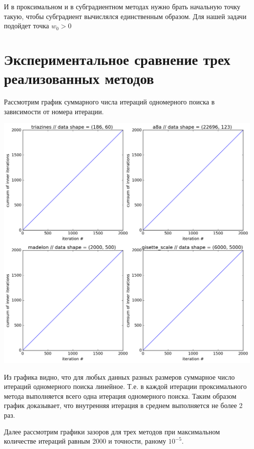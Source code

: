 \documentclass[12pt, a4paper]{article}
\begin{document}
    И в проксимальном и в субградиентном методах нужно брать начальную точку такую, чтобы субградиент вычислялся единственным образом. Для нашей задачи подойдет точка $w_0 > 0$


    \section{Экспериментальное сравнение трех реализованных методов}

    Рассмотрим график суммарного числа итераций одномерного поиска в зависимости от номера итерации.

    \def \picwidth {16cm}
    \begin{center}\includegraphics[width=\picwidth]{prox_grad_cumsum.png}\end{center}

    Из графика видно, что для любых данных разных размеров суммарное число итераций одномерного поиска линейное. Т.е. в каждой итерации проксимального метода выполняется всего одна итерация
    одномерного поиска. Таким образом график доказывает, что внутренняя итерация в среднем выполняется не более 2 раз.

    Далее рассмотрим графики зазоров для трех методов при максимальном количестве итераций равным 2000 и точности, раному $10^{-5}$.
\end{document}
